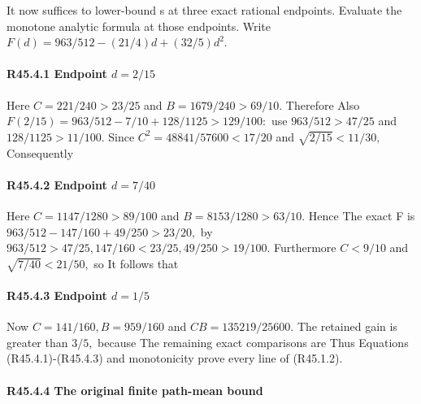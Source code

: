 It now suffices to lower-bound s at three exact rational endpoints.
Evaluate the monotone analytic formula at those endpoints. Write \(F(d)=963/512-(21/4)d+(32/5)d^2.\)

\paragraph{R45.4.1 Endpoint \(d=2/15\)}

Here \(C=221/240>23/25\) and \(B=1679/240>69/10.\) Therefore
Also \(F(2/15)=963/512-7/10+128/1125>129/100:\) use
\(963/512>47/25\) and \(128/1125>11/100.\) Since
\(C^2=48841/57600<17/20\) and \(\sqrt{2/15}<11/30,\allowbreak \)
Consequently

\paragraph{R45.4.2 Endpoint \(d=7/40\)}

Here \(C=1147/1280>89/100\) and \(B=8153/1280>63/10.\) Hence
The exact F is \(963/512-147/160+49/250>23/20,\allowbreak \) by
\(963/512>47/25,\allowbreak  147/160<23/25,\allowbreak  49/250>19/100.\)
Furthermore \(C<9/10\) and \(\sqrt{7/40}<21/50,\allowbreak \) so
It follows that

\paragraph{R45.4.3 Endpoint \(d=1/5\)}

Now \(C=141/160,\allowbreak  B=959/160\) and \(CB=135219/25600.\) The retained gain
is greater than \(3/5,\allowbreak \) because
The remaining exact comparisons are
Thus
Equations (R45.4.1)-(R45.4.3) and monotonicity prove every line of (R45.1.2).

\paragraph{R45.4.4 The original finite path-mean bound}

